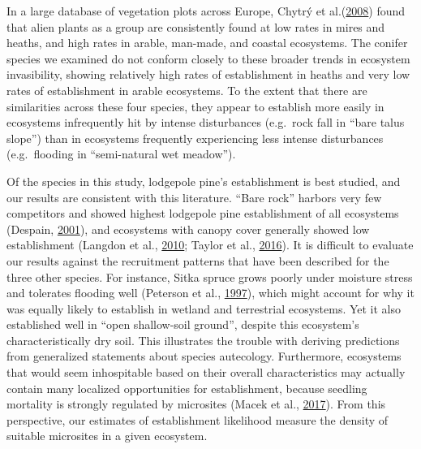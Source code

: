 \documentclass[
]{article}
\begin{document}
In a large database of vegetation plots across Europe, Chytrý et al.(\protect\hyperlink{ref-chytryHabitatInvasionsAlien2008}{2008}) found that alien plants as a group are consistently found at low rates in mires and heaths, and high rates in arable, man-made, and coastal ecosystems.
The conifer species we examined do not conform closely to these broader trends in ecosystem invasibility, showing relatively high rates of establishment in heaths and very low rates of establishment in arable ecosystems.
To the extent that there are similarities across these four species, they appear to establish more easily in ecosystems infrequently hit by intense disturbances (e.g.~rock fall in ``bare talus slope'') than in ecosystems frequently experiencing less intense disturbances (e.g.~flooding in ``semi-natural wet meadow'').

Of the species in this study, lodgepole pine's establishment is best studied, and our results are consistent with this literature.
``Bare rock'' harbors very few competitors and showed highest lodgepole pine establishment of all ecosystems (Despain, \protect\hyperlink{ref-despainDispersalEcologyLodgepole2001}{2001}), and ecosystems with canopy cover generally showed low establishment (Langdon et al., \protect\hyperlink{ref-langdonPinusContortaInvasion2010}{2010}; Taylor et al., \protect\hyperlink{ref-taylorDriversPlantInvasion2016}{2016}).
It is difficult to evaluate our results against the recruitment patterns that have been described for the three other species.
For instance, Sitka spruce grows poorly under moisture stress and tolerates flooding well (Peterson et al., \protect\hyperlink{ref-petersonEcologyManagementSitka1997}{1997}), which might account for why it was equally likely to establish in wetland and terrestrial ecosystems.
Yet it also established well in ``open shallow-soil ground'', despite this ecosystem's characteristically dry soil.
This illustrates the trouble with deriving predictions from generalized statements about species autecology.
Furthermore, ecosystems that would seem inhospitable based on their overall characteristics may actually contain many localized opportunities for establishment, because seedling mortality is strongly regulated by microsites (Macek et al., \protect\hyperlink{ref-macekLifeDeathPicea2017}{2017}).
From this perspective, our estimates of establishment likelihood measure the density of suitable microsites in a given ecosystem.
\end{document}
